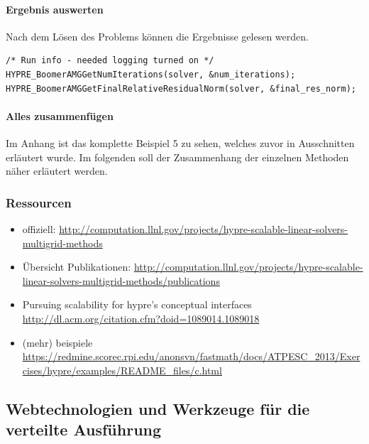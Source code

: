 \documentclass[a4paper,10pt]{article}
\numberwithin{figure}{section}
\numberwithin{table}{section}
\begin{document}
\paragraph{Ergebnis auswerten}

Nach dem Lösen des Problems können die Ergebnisse gelesen werden.

\begin{lstlisting}[frame=single,caption=HYPRE Nutzung: Solver mit Preconditioner, breaklines=true]
/* Run info - needed logging turned on */
HYPRE_BoomerAMGGetNumIterations(solver, &num_iterations);
HYPRE_BoomerAMGGetFinalRelativeResidualNorm(solver, &final_res_norm);
\end{lstlisting}

\paragraph{Alles zusammenfügen}

Im Anhang ist das komplette Beispiel 5 zu sehen, welches zuvor in Ausschnitten erläutert wurde.
Im folgenden soll der Zusammenhang der einzelnen Methoden näher erläutert werden.
\cite{hypreReferenceManual}

\subsubsection{Ressourcen}

\begin{itemize}
 \item offiziell: \url{http://computation.llnl.gov/projects/hypre-scalable-linear-solvers-multigrid-methods}
 \item Übersicht Publikationen: \url{http://computation.llnl.gov/projects/hypre-scalable-linear-solvers-multigrid-methods/publications}
 \item Pursuing scalability for hypre's conceptual interfaces \url{http://dl.acm.org/citation.cfm?doid=1089014.1089018}
 \item (mehr) beispiele \url{https://redmine.scorec.rpi.edu/anonsvn/fastmath/docs/ATPESC_2013/Exercises/hypre/examples/README_files/c.html}
\end{itemize}

\subsection{Webtechnologien und Werkzeuge für die verteilte Ausführung}
\end{document}
